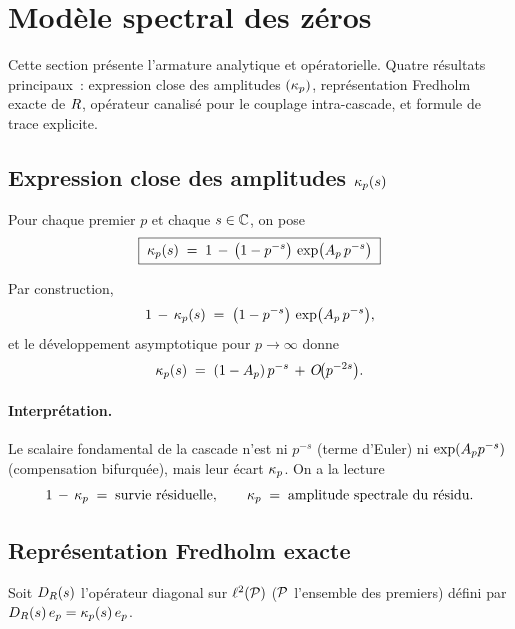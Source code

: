 \section{Modèle spectral des zéros}
\label{sec:modele_spectral}

Cette section présente l'armature analytique et opératorielle. Quatre
résultats principaux~: expression close des amplitudes $(\kappa_p)$,
représentation Fredholm exacte de $R$, opérateur canalisé pour le
couplage intra-cascade, et formule de trace explicite.

\subsection{Expression close des amplitudes $\kappa_p(s)$}
\label{sec:kappa_p}

\begin{definition}
\label{def:kappa_p}
Pour chaque premier $p$ et chaque $s \in \mathbb{C}$, on pose
\begin{equation}
\boxed{\;\kappa_p(s) \;=\; 1 \,-\, \big(1 - p^{-s}\big)\,\exp\!\big(A_p\,p^{-s}\big)\;}
\label{eq:kappa_p}
\end{equation}
\end{definition}

\noindent Par construction,
\[
1 \,-\, \kappa_p(s) \;=\; \big(1 - p^{-s}\big)\,\exp\!\big(A_p\,p^{-s}\big),
\]
et le développement asymptotique pour $p \to \infty$ donne
\begin{equation}
\kappa_p(s) \;=\; (1 - A_p)\,p^{-s} \,+\, O\!\big(p^{-2s}\big).
\label{eq:kappa_asymp}
\end{equation}

\paragraph{Interprétation.}
Le scalaire fondamental de la cascade n'est ni $p^{-s}$ (terme d'Euler)
ni $\exp(A_p p^{-s})$ (compensation bifurquée), mais leur écart $\kappa_p$.
On a la lecture
\[
1 \,-\, \kappa_p \;=\; \text{survie résiduelle},
\qquad
\kappa_p \;=\; \text{amplitude spectrale du résidu}.
\]

\subsection{Représentation Fredholm exacte}
\label{sec:fredholm}

Soit $D_R(s)$ l'opérateur diagonal sur $\ell^{2}(\mathcal{P})$ ($\mathcal{P}$
l'ensemble des premiers) défini par $D_R(s)\,e_p = \kappa_p(s)\,e_p$.

